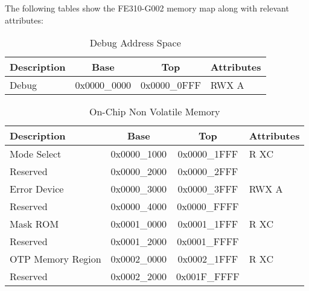 The following tables show the FE310-G002 memory map along with relevant attributes:\cite{fe310g002manMMap}

\begin{table}[H]
    \centering
    \begin{tabular}{| p{3cm} | c | c | p{3cm} |}
        \hline
        \textbf{Description} & \textbf{Base} & \textbf{Top} & \textbf{Attributes}\\
        \hline
        \hline
        Debug & 0x0000\_0000 & 0x0000\_0FFF & RWX A\\
        \hline
    \end{tabular}
    \caption{Debug Address Space}
\end{table}

\begin{table}[H]
    \centering
    \begin{tabular}{| p{4cm} | c | c | p{3cm} |}
        \hline
        \textbf{Description} & \textbf{Base} & \textbf{Top} & \textbf{Attributes}\\
        \hline
        Mode Select & 0x0000\_1000 & 0x0000\_1FFF & R XC\\
        Reserved & 0x0000\_2000 & 0x0000\_2FFF & \\
        Error Device & 0x0000\_3000 & 0x0000\_3FFF & RWX A\\
        Reserved & 0x0000\_4000 & 0x0000\_FFFF & \\
        Mask ROM & 0x0001\_0000 & 0x0001\_1FFF & R XC\\
        Reserved & 0x0001\_2000 & 0x0001\_FFFF & \\
        OTP Memory Region & 0x0002\_0000 & 0x0002\_1FFF & R XC\\
        Reserved & 0x0002\_2000 & 0x001F\_FFFF & \\
        \hline
    \end{tabular}
    \caption{On-Chip Non Volatile Memory}
\end{table}


